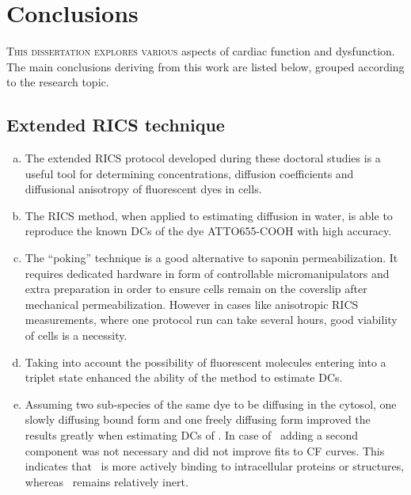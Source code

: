 
\chapter{Conclusions}
\label{partCon:conclusions}
\setlength{\parskip}{0.8ex plus 0.5ex minus 0.1ex}

\lettrine[lines=2, lhang=0.33, loversize=0.25]{T}{his dissertation
explores various} aspects of cardiac function and dysfunction. The main conclusions deriving from this work are listed below, grouped
according to the research topic.

\vspace{-0.2cm}





\section*{Extended RICS technique}
\begin{enumerate}[a)]
    \item The extended \ac{RICS} protocol developed during these doctoral studies
is a useful tool for determining concentrations, diffusion coefficients
and diffusional anisotropy of fluorescent dyes in cells.

\item The \ac{RICS} method, when applied to estimating diffusion in
    water, is
able to reproduce the known \acp{DC} of the dye ATTO655-COOH with high
accuracy.

\item The ``poking'' technique is a good alternative to saponin
permeabilization. It requires dedicated hardware in form of
controllable micromanipulators and extra preparation in order to ensure cells
remain on the coverslip after mechanical permeabilization. However in
cases like anisotropic \ac{RICS} measurements, where one protocol run can
take several hours, good viability of cells is a necessity.

\item Taking into account the possibility of fluorescent molecules entering
into a triplet state enhanced the ability of the method to estimate
\acp{DC}.

\item Assuming two sub-species of the same dye to be diffusing in the cytosol,
one slowly diffusing bound form and one freely diffusing form improved
the results greatly when estimating \acp{DC} of \ATP. In case of \DEX\
adding a second component was not necessary and did not improve fits to
\ac{CF} curves. This indicates that \ATP\ is more actively binding to
intracellular proteins or structures, whereas \DEX\ remains relatively
inert.
\setcounter{saveenum}{\value{enumi}}
\end{enumerate}




